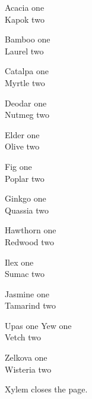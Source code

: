 \documentclass[12pt]{article}
\begin{document}
{\tiny Acacia one\\Kapok two\par}

{\scriptsize Bamboo one\\Laurel two\par}

{\footnotesize Catalpa one\\Myrtle two\par}

{\small Deodar one\\Nutmeg two\par}

{\normalsize Elder one\\Olive two\par}

{\large Fig one\\Poplar two\par}

{\Large Ginkgo one\\Quassia two\par}

{\LARGE Hawthorn one\\Redwood two\par}

{\huge Ilex one\\Sumac two\par}

{\Huge Jasmine one\\Tamarind two\par}

Upas one {\small Yew} one\\Vetch two\par

{\small Zelkova one\\Wisteria two}\par

Xylem closes the page.
\end{document}
